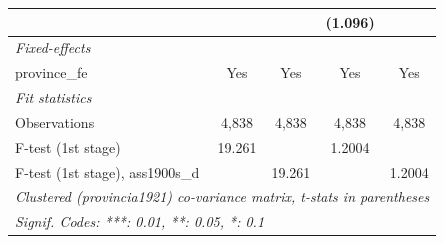 \begin{table}[htbp]
\begin{tabular}{lcccc}
                                       &                        &                        & (1.096)                &   \\   
      \midrule
      \emph{Fixed-effects}\\
      province\_fe                     & Yes                    & Yes                    & Yes                    & Yes\\  
      \midrule
      \emph{Fit statistics}\\
      Observations                     & 4,838                  & 4,838                  & 4,838                  & 4,838\\  
      F-test (1st stage)               & 19.261                 &                        & 1.2004                 & \\  
      F-test (1st stage), ass1900s\_d  &                        & 19.261                 &                        & 1.2004\\  
      \midrule \midrule
      \multicolumn{5}{l}{\emph{Clustered (provincia1921) co-variance matrix, t-stats in parentheses}}\\
      \multicolumn{5}{l}{\emph{Signif. Codes: ***: 0.01, **: 0.05, *: 0.1}}\\
   \end{tabular}
\end{table}


